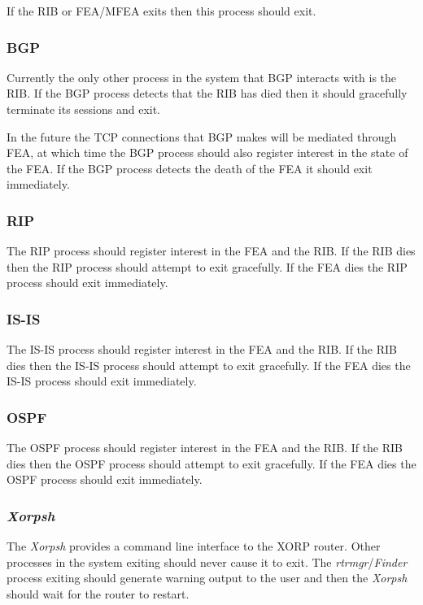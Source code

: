 \documentclass[11pt]{article}
\makeatletter
\newcommand{\finder} {{\em Finder}\@\xspace}
\newcommand{\xorpsh} {{\em Xorpsh}\@\xspace}
\newcommand{\rtrmgr} {{\em rtrmgr}\@\xspace}
\makeatother
\begin{document}
If the RIB or FEA/MFEA exits then this process should exit.

\subsubsection{BGP}

Currently the only other process in the system that BGP interacts
with is the RIB. If the BGP process detects that the RIB has died then
it should gracefully terminate its sessions and exit.

In the future the TCP connections that BGP makes will be mediated
through FEA, at which time the BGP process should also register
interest in the state of the FEA. If the BGP process detects the death
of the FEA it should exit immediately.

\subsubsection{RIP}

The RIP process should register interest in the FEA and the RIB. If
the RIB dies then the RIP process should attempt to exit gracefully.
If the FEA dies the RIP process should exit immediately.

\subsubsection{IS-IS}

The IS-IS process should register interest in the FEA and the RIB. If
the RIB dies then the IS-IS process should attempt to exit gracefully.
If the FEA dies the IS-IS process should exit immediately.

\subsubsection{OSPF}

The OSPF process should register interest in the FEA and the RIB. If
the RIB dies then the OSPF process should attempt to exit gracefully.
If the FEA dies the OSPF process should exit immediately.

\subsubsection{\label{xorpsh}\xorpsh}

The \xorpsh provides a command line interface to the XORP router.
Other processes in the system exiting should never cause it to
exit. The \rtrmgr/\finder process exiting should generate
warning output to the user and then the \xorpsh should wait for the
router to restart.
\end{document}
